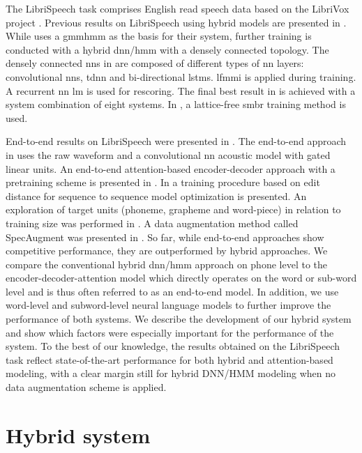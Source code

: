 \documentclass[a4paper]{article}
\begin{document}
The LibriSpeech task comprises English read speech data based on the LibriVox project \cite{panayotov2015:librispeech}.
Previous results on LibriSpeech using hybrid models are presented in \cite{han2017:capio,kanda2018:lattice}.
While \cite{han2017:capio} uses a \ac{gmmhmm}   as the basis for their system, further training is conducted with a hybrid \acs{dnn}/\ac{hmm} with a densely connected topology.
The densely connected \acp{nn} in \cite{han2017:capio} are composed of different types of \ac{nn} layers: convolutional \acp{nn}, \acl*{tdnn} and bi-directional \acp{lstm}.
\Ac{lfmmi} is applied during training.
A recurrent \ac{nn} \ac{lm} is used for rescoring.
The final best result in \cite{han2017:capio} is achieved with a system combination of eight systems.
In \cite{kanda2018:lattice}, a lattice-free \ac{smbr} training method is used.

End-to-end results on LibriSpeech were presented in
\cite{zeyer2018:asr-attention,zeyer2018:attanalysis,sabour2018ocd,zeghidour2018:fully,irie2019}.
The end-to-end approach in \cite{zeghidour2018:fully} uses the raw waveform and a convolutional \ac{nn} acoustic model with gated linear units.
An end-to-end attention-based encoder-decoder approach with a pretraining scheme is presented in \cite{zeyer2018:asr-attention,zeyer2018:attanalysis}.
In \cite{sabour2018ocd} a training procedure based on edit distance for sequence to sequence model optimization is presented.
An exploration of target units (phoneme, grapheme and word-piece) in relation to training size was performed in \cite{irie2019}.
A data augmentation method called SpecAugment was presented in \cite{park2019specaugment}.
So far, while end-to-end approaches show competitive performance, they are outperformed by hybrid approaches.
We compare the conventional hybrid \acs{dnn}/\acs{hmm} approach on phone level
to the encoder-decoder-attention model which directly operates on the word or sub-word level
and is thus often referred to as an end-to-end model.
In addition, we use word-level and subword-level neural language models to further improve the performance of both systems.
We describe the development of our hybrid system and show which factors were especially important for the performance of the system.
To the best of our knowledge, the results obtained on the LibriSpeech task reflect state-of-the-art performance for both hybrid and attention-based modeling, with a clear margin still for hybrid DNN/HMM modeling when no data augmentation scheme is applied.

\section{Hybrid system}
\label{sec:gmmhmm}
\end{document}
